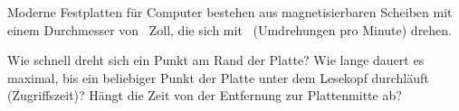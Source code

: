Moderne Festplatten für Computer bestehen aus magnetisierbaren Scheiben mit einem Durchmesser von \nZoO~Zoll, die sich mit \nFpO\ (Umdrehungen pro Minute) drehen.

\begin{abcliste}
\abc Wie schnell dreht sich ein Punkt am Rand der Platte?
\abc Wie lange dauert es maximal, bis ein beliebiger Punkt der Platte unter dem Lesekopf durchläuft (Zugriffszeit)? Hängt die Zeit von der Entfernung zur Plattenmitte ab?
\end{abcliste}
